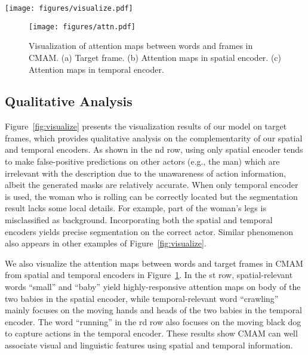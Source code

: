 \documentclass[final]{cvpr}
\begin{document}
\begin{figure*}[t]
   \begin{center}
      \texttt{[image: figures/visualize.pdf]}
   \end{center}
      \caption{Qualitative analysis on target frames. (a) Target frame. (b) Results of our model using spatial encoder only. (c) Results of our model using temporal encoder only. (d) Results of our model using spatial and temporal encoders. (e) Ground-truth.}
   \label{fig:visualize}
\end{figure*}

\begin{figure}[!htbp]
   \begin{center}
      \texttt{[image: figures/attn.pdf]}
   \end{center}
      \caption{Visualization of attention maps between words and frames in CMAM. (a) Target frame. (b) Attention maps in spatial encoder. (c) Attention maps in temporal encoder.}
   \label{fig:attn}
\end{figure}

\subsection{Qualitative Analysis}
Figure~\ref{fig:visualize} presents the visualization results of our model on target frames, which provides qualitative analysis on the complementarity of our spatial and temporal encoders. 
As shown in the nd row, using only spatial encoder tends to make false-positive predictions on other actors (e.g., the man) which are irrelevant with the description due to the unawareness of action information, albeit the generated masks are relatively accurate. 
When only temporal encoder is used, the woman who is rolling can be correctly located but the segmentation result lacks some local details. 
For example, part of the woman's legs is misclassified as background. 
Incorporating both the spatial and temporal encoders yields precise segmentation on the correct actor. 
Similar phenomenon also appears in other examples of Figure~\ref{fig:visualize}. 

We also visualize the attention maps between words and target frames in CMAM from spatial and temporal encoders in Figure~\ref{fig:attn}. 
In the st row, spatial-relevant words ``small'' and ``baby'' yield highly-responsive attention maps on body of the two babies in the spatial encoder, while temporal-relevant word ``crawling'' mainly focuses on the moving hands and heads of the two babies in the temporal encoder. 
The word ``running'' in the rd row also focuses on the moving black dog to capture actions in the temporal encoder.
These results show CMAM can well associate visual and linguistic features using spatial and temporal information.
\end{document}

